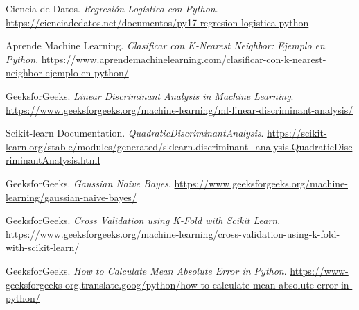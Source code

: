 \documentclass[12pt,a4paper]{article}
\begin{document}
\begin{thebibliography}{9}

Ciencia de Datos. \textit{Regresión Logística con Python}. 
\url{https://cienciadedatos.net/documentos/py17-regresion-logistica-python}

Aprende Machine Learning. \textit{Clasificar con K-Nearest Neighbor: Ejemplo en Python}. 
\url{https://www.aprendemachinelearning.com/clasificar-con-k-nearest-neighbor-ejemplo-en-python/}

GeeksforGeeks. \textit{Linear Discriminant Analysis in Machine Learning}. 
\url{https://www.geeksforgeeks.org/machine-learning/ml-linear-discriminant-analysis/}

Scikit-learn Documentation. \textit{QuadraticDiscriminantAnalysis}. 
\url{https://scikit-learn.org/stable/modules/generated/sklearn.discriminant_analysis.QuadraticDiscriminantAnalysis.html}

GeeksforGeeks. \textit{Gaussian Naive Bayes}. 
\url{https://www.geeksforgeeks.org/machine-learning/gaussian-naive-bayes/}

GeeksforGeeks. \textit{Cross Validation using K-Fold with Scikit Learn}. 
\url{https://www.geeksforgeeks.org/machine-learning/cross-validation-using-k-fold-with-scikit-learn/}

GeeksforGeeks. \textit{How to Calculate Mean Absolute Error in Python}. 
\url{https://www-geeksforgeeks-org.translate.goog/python/how-to-calculate-mean-absolute-error-in-python/}

\end{thebibliography}
\end{document}
